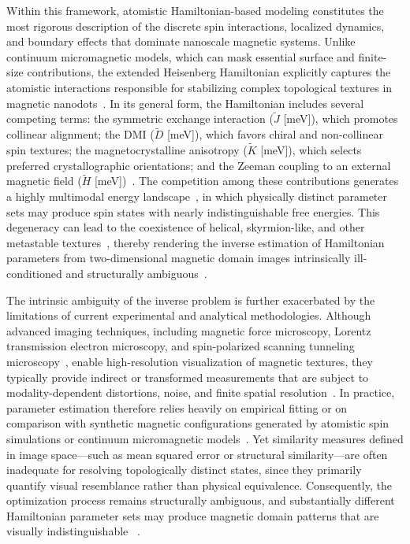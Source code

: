 \documentclass[a4paper,fleqn]{cas-sc}
\begin{document}
Within this framework, atomistic Hamiltonian-based modeling constitutes the most rigorous description of the discrete spin interactions, localized dynamics, and boundary effects that dominate nanoscale magnetic systems. Unlike continuum micromagnetic models, which can mask essential surface and finite-size contributions, the extended Heisenberg Hamiltonian explicitly captures the atomistic interactions responsible for stabilizing complex topological textures in magnetic nanodots~\cite{evans2014atomistic}. In its general form, the Hamiltonian includes several competing terms: the symmetric exchange interaction ($\tilde{J}$ [meV]), which promotes collinear alignment; the DMI ($\tilde{D}$ [meV]), which favors chiral and non-collinear spin textures; the magnetocrystalline anisotropy ($\tilde{K}$ [meV]), which selects preferred crystallographic orientations; and the Zeeman coupling to an external magnetic field ($\tilde{H}$ [meV])~\cite{aldarawsheh2023intrinsic}. The competition among these contributions generates a highly multimodal energy landscape~\cite{tokura2020magnetic,finocchio2016magnetic}, in which physically distinct parameter sets may produce spin states with nearly indistinguishable free energies. This degeneracy can lead to the coexistence of helical, skyrmion-like, and other metastable textures~\cite{back20202020, he2023ferroelectrically}, thereby rendering the inverse estimation of Hamiltonian parameters from two-dimensional magnetic domain images intrinsically ill-conditioned and structurally ambiguous~\cite{murakami2022inverse, kwon2020magnetic}.

The intrinsic ambiguity of the inverse problem is further exacerbated by the limitations of current experimental and analytical methodologies. Although advanced imaging techniques, including magnetic force microscopy, Lorentz transmission electron microscopy, and spin-polarized scanning tunneling microscopy~\cite{nguyen2022cooperative}, enable high-resolution visualization of magnetic textures, they typically provide indirect or transformed measurements that are subject to modality-dependent distortions, noise, and finite spatial resolution~\cite{zhao2025overview, gaida2023lorentz}. In practice, parameter estimation therefore relies heavily on empirical fitting or on comparison with synthetic magnetic configurations generated by atomistic spin simulations or continuum micromagnetic models~\cite{d2023micromagnetic, lepadatu2021micromagnetic}. Yet similarity measures defined in image space—such as mean squared error or structural similarity—are often inadequate for resolving topologically distinct states, since they primarily quantify visual resemblance rather than physical equivalence. Consequently, the optimization process remains structurally ambiguous, and substantially different Hamiltonian parameter sets may produce magnetic domain patterns that are visually indistinguishable ~\cite{yin2023computational, karnatov2025analysis}.
\end{document}
